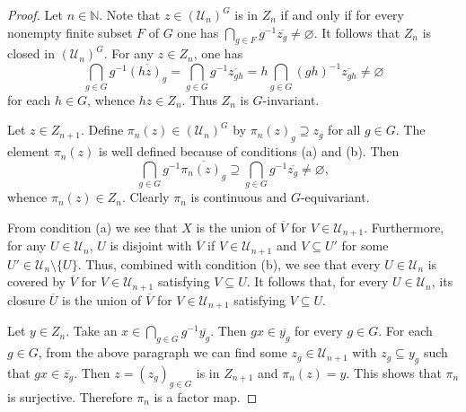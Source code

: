 \documentclass[11pt]{amsart}
\theoremstyle{definition}
\numberwithin{equation}{section}
\theoremstyle{definition}
\newcommand{\cU}{{\mathcal U}}
\newcommand{\Nb}{{\mathbb N}}
\begin{document}
\begin{proof} Let $n\in \Nb$. Note that $z\in (\cU_n)^G$  is in $Z_n$ if and only if for every nonempty finite subset $F$ of $G$ one has  $\bigcap_{g\in F} g^{-1}\overline{z_g}\neq \varnothing$. It follows that $Z_n$ is closed in $(\cU_n)^G$. For any $z\in Z_n$, one has
$$ \bigcap_{g\in G} g^{-1}\overline{(hz)_g}= \bigcap_{g\in G} g^{-1}\overline{z_{gh}}=h\bigcap_{g\in G} (gh)^{-1}\overline{z_{gh}}\neq \varnothing$$
for each $h\in G$, whence $hz\in Z_n$. Thus $Z_n$ is $G$-invariant. 

Let $z\in Z_{n+1}$. Define $\pi_n(z)\in (\cU_n)^G$ by $\pi_n(z)_g\supseteq z_g$ for all $g\in G$. The element $\pi_n(z)$ is well defined because of conditions (a) and (b). Then 
$$ \bigcap_{g\in G} g^{-1}\overline{\pi_n(z)_g}\supseteq \bigcap_{g\in G}g^{-1}\overline{z_g}\neq \varnothing,$$
whence $\pi_n(z)\in Z_n$. Clearly $\pi_n$ is continuous and $G$-equivariant. 

From condition (a) we see that $X$ is the union of $\overline{V}$ for $V\in \cU_{n+1}$.  Furthermore, for any $U\in \cU_n$, $U$ is disjoint with $\overline{V}$ if $V\in \cU_{n+1}$ and $V\subseteq U'$ for some $U'\in \cU_n\setminus \{U\}$. Thus, combined with condition (b), we see that every $U\in \cU_n$ is covered by $\overline{V}$ for $V\in \cU_{n+1}$ satisfying $V\subseteq U$. It follows that, for every $U\in \cU_n$, its closure $\overline{U}$ is the union of $\overline{V}$ for $V\in \cU_{n+1}$ satisfying $V\subseteq U$. 

Let $y\in Z_n$. Take an $x\in \bigcap_{g\in G} g^{-1}\overline{y_g}$. Then $gx\in \overline{y_g}$ for every $g\in G$. For each $g\in G$, from the above paragraph we can find some $z_g\in \cU_{n+1}$ with $z_g\subseteq y_g$ such that $gx\in \overline{z_g}$. Then $z=(z_g)_{g\in G}$ is in $Z_{n+1}$ and $\pi_n(z)=y$. This shows that $\pi_n$ is surjective. Therefore $\pi_n$ is a factor map. 


\end{proof}
\end{document}
